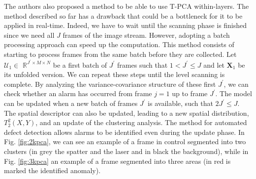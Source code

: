 The authors also proposed a method to be able to use T-PCA within-layers. The method described so far has a drawback that could be a bottleneck for it to be applied in real-time. Indeed, we have to wait until the scanning phase is finished since we need all $J$ frames of the image stream. However, adopting a batch processing approach can speed up the computation. This method consists of starting to process frames from the same batch before they are collected. Let $\mathcal{U}_1 \in$ $\mathbb{R}^{J^{\prime} \times M \times N}$ be a first batch of $J^{\prime}$ frames such that $1<J^{\prime} \leq J$ and let $\mathbf{X}_1$ be its unfolded version. We can repeat these steps until the level scanning is complete. By analyzing the variance-covariance structure of these first $J^{\prime}$, we can check whether an alarm has occurred from frame $j=1$ up to frame $J^{\prime}$. The model can be updated when a new batch of frames $J^{\prime}$ is available, such that $2 J^{\prime} \leq J$. The spatial descriptor can also be updated, leading to a new spatial distribution, $T_2^2(X, Y)$, and an update of the clustering analysis. The method for automated defect detection allows alarms to be identified even during the update phase. In Fig. \ref{fig:2kpca}, we can see an example of a frame in control segmented into two clusters (in grey the spatter and the laser and in black the background), while in Fig. \ref{fig:3kpca} an example of a frame segmented into three areas (in red is marked the identified anomaly).

